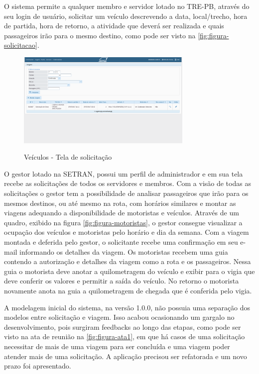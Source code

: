 O sistema permite a qualquer membro e servidor lotado no TRE-PB, através do seu login de usuário, solicitar um veículo descrevendo a data, local/trecho, hora de partida, hora de retorno, a atividade que deverá ser realizada e quais passageiros irão para o mesmo destino, como pode ser visto na \autoref{fig:figura-solicitacao}.

\begin{figure}[!htb]
    \centering
    \caption{Veículos - Tela de solicitação}
    \includegraphics[width=0.75\textwidth]{./dados/figuras/veiculos-tela1.png}
    \label{fig:figura-solicitacao}
\end{figure}

O gestor lotado na SETRAN, possui um perfil de administrador e em sua tela recebe as solicitações de todos os servidores e membros. Com a visão de todas as solicitações o gestor tem a possibilidade de analisar passageiros que irão para os mesmos destinos, ou até mesmo na rota, com horários similares e montar as viagens adequando a disponibilidade de motoristas e veículos. Através de um quadro, exibido na figura \autoref{fig:figura-motoristas}, o gestor consegue visualizar a ocupação dos veículos e motoristas pelo horário e dia da semana. Com a viagem montada e deferida pelo gestor, o solicitante recebe uma confirmação em seu e-mail informando os detalhes da viagem. Os motoristas recebem uma guia contendo a autorização e detalhes da viagem como a rota e os passageiros. Nessa guia o motorista deve anotar a quilometragem do veículo e exibir para o vigia que deve conferir os valores e permitir a saída do veículo. No retorno o motorista novamente anota na guia a quilometragem de chegada que é conferida pelo vigia.

A modelagem inicial do sistema, na versão 1.0.0, não possuia uma separação dos modelos entre solicitação e viagem. Isso acabou ocasionando um gargalo no desenvolvimento, pois surgiram feedbacks ao longo das etapas, como pode ser visto na ata de reunião na \autoref{fig:figura-ata1}, em que há casos de uma solicitação necessitar de mais de uma viagem para ser concluída e uma viagem poder atender mais de uma solicitação. A aplicação precisou ser refatorada e um novo prazo foi apresentado.

